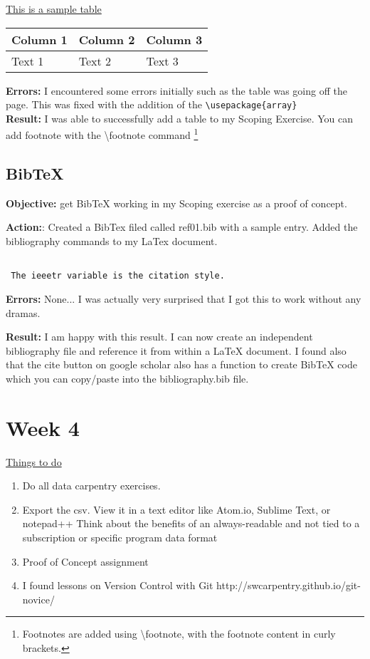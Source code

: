 \documentclass[a4paper,11pt]{article}
\begin{document}
\noindent \underline{This is a sample table}
\begin{center}
\begin{tabular}{ | m{2.5cm} | m{6cm}| m{6cm} | } 
\hline
Column 1 & Column 2 & Column 3 \\ 
\hline
Text 1 & Text 2 & Text 3 \\ 
\hline
\end{tabular}
\end{center}

\noindent \textbf{Errors:}  I encountered some errors initially such as the table was going off the page. This was fixed with the addition of the \verb|\usepackage{array}|\\ 

\noindent \textbf{Result:} I was able to successfully add a table to my Scoping Exercise.
You can add footnote with the \textbackslash footnote command \footnote{Footnotes are added using \textbackslash footnote, with the footnote content in curly brackets.}

\subsection{BibTeX}

\noindent \textbf{Objective:} get BibTeX working in my Scoping exercise as a proof of concept. 

\noindent \textbf{Action:}: Created a BibTex filed called ref01.bib with a sample entry.
Added the bibliography commands to my LaTex document.
\begin{verbatim}

 The ieeetr variable is the citation style. 
\end{verbatim}
\noindent \textbf{Errors:} None... I was actually very surprised that I got this to work without any dramas.

\noindent \textbf{Result:} I am happy with this result. I can now create an independent bibliography file and reference it from within a LaTeX document. I found also that the cite button on google scholar also has a function to create BibTeX code which you can copy/paste into the bibliography.bib file. 

\newpage

\section{Week 4}

\underline {Things to do}

\begin{enumerate}
\item Do all data carpentry exercises.
\item Export the csv. View it in a text editor like Atom.io, Sublime Text, or notepad++ Think about the benefits of an always-readable and not tied to a subscription or specific program data format
\item Proof of Concept assignment 
\item I found lessons on Version Control with Git http://swcarpentry.github.io/git-novice/
\end{enumerate}
\end{document}

